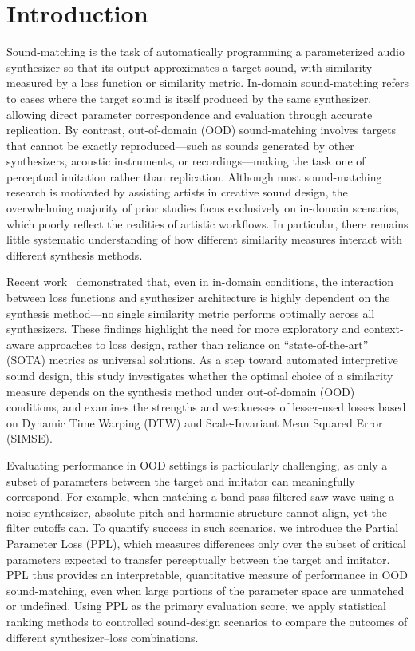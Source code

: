 \documentclass[runningheads]{llncs}
\begin{document}
\section{Introduction}
\label{sec:intro} 

Sound-matching is the task of automatically programming a parameterized audio synthesizer so that its output approximates a target sound, with similarity measured by a loss function or similarity metric.
In-domain sound-matching refers to cases where the target sound is itself produced by the same synthesizer, allowing direct parameter correspondence and evaluation through accurate replication.
By contrast, out-of-domain (OOD) sound-matching involves targets that cannot be exactly reproduced—such as sounds generated by other synthesizers, acoustic instruments, or recordings—making the task one of perceptual imitation rather than replication.
Although most sound-matching research is motivated by assisting artists in creative sound design, the overwhelming majority of prior studies focus exclusively on in-domain scenarios, which poorly reflect the realities of artistic workflows.
In particular, there remains little systematic understanding of how different similarity measures interact with different synthesis methods.

Recent work~\cite{salimi2025evaluating} demonstrated that, even in in-domain conditions, the interaction between loss functions and synthesizer architecture is highly dependent on the synthesis method—no single similarity metric performs optimally across all synthesizers.
These findings highlight the need for more exploratory and context-aware approaches to loss design, rather than reliance on “state-of-the-art” (SOTA) metrics as universal solutions.
As a step toward automated interpretive sound design, this study investigates whether the optimal choice of a similarity measure depends on the synthesis method under out-of-domain (OOD) conditions, and examines the strengths and weaknesses of lesser-used losses based on Dynamic Time Warping (DTW) and Scale-Invariant Mean Squared Error (SIMSE).

Evaluating performance in OOD settings is particularly challenging, as only a subset of parameters between the target and imitator can meaningfully correspond.
For example, when matching a band-pass-filtered saw wave using a noise synthesizer, absolute pitch and harmonic structure cannot align, yet the filter cutoffs can.
To quantify success in such scenarios, we introduce the Partial Parameter Loss (PPL), which measures differences only over the subset of critical parameters expected to transfer perceptually between the target and imitator.
PPL thus provides an interpretable, quantitative measure of performance in OOD sound-matching, even when large portions of the parameter space are unmatched or undefined.
Using PPL as the primary evaluation score, we apply statistical ranking methods to controlled sound-design scenarios to compare the outcomes of different synthesizer–loss combinations.
\end{document}
